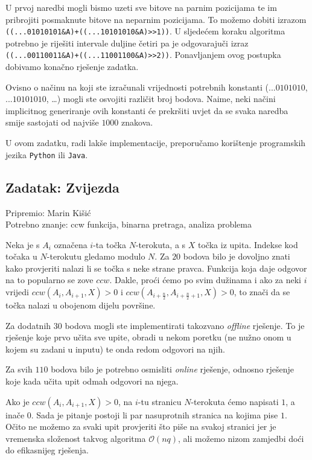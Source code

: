 \documentclass[a4paper]{article}
\begin{document}
U prvoj naredbi mogli bismo uzeti sve bitove na parnim pozicijama te im
pribrojiti posmaknute bitove na neparnim pozicijama. To možemo dobiti izrazom
\verb|((...01010101&A)+((...10101010&A)>>1))|. U sljedećem koraku algoritma
potrebno je riješiti intervale duljine četiri pa je odgovarajuči izraz
\verb|((...00110011&A)+((...11001100&A)>>2))|. Ponavljanjem ovog postupka
dobivamo konačno rješenje zadatka.

Ovisno o načinu na koji ste izračunali vrijednosti potrebnih konstanti
($...0101010$, $...10101010$, \dots) mogli ste osvojiti različit broj
bodova. Naime, neki načini implicitnog generiranje ovih konstanti
će prekršiti uvjet da se svaka naredba smije sastojati od najviše $1000$
znakova.

U ovom zadatku, radi lakše implementacije, preporučamo korištenje programskih
jezika \texttt{Python} ili \texttt{Java}.

\subsection*{Zadatak: Zvijezda}
\textsf{Pripremio: Marin Kišić}\\
\textsf{Potrebno znanje: ccw funkcija, binarna pretraga, analiza problema}

Neka je s $A_i$ označena $i$-ta točka $N$-terokuta, a s $X$ točka iz upita.
Indekse kod točaka u $N$-terokutu gledamo modulo $N$.  Za $20$ bodova bilo je
dovoljno znati kako provjeriti nalazi li se točka s neke strane pravca.
Funkcija koja daje odgovor na to popularno se zove $ccw$. Dakle, proći ćemo po
svim dužinama i ako za neki $i$ vrijedi $ccw(A_i, A_{i+1}, X) > 0$ i
$ccw(A_{i+\frac{n}{2}}, A_{i+\frac{n}{2}+1}, X) > 0$, to znači da se točka
nalazi u obojenom dijelu površine.

Za dodatnih $30$ bodova mogli ste implementirati takozvano \textit{offline}
rješenje.  To je rješenje koje prvo učita sve upite, obradi u nekom poretku (ne
nužno onom u kojem su zadani u inputu) te onda redom odgovori na njih.

Za svih $110$ bodova bilo je potrebno osmisliti \textit{online} rješenje,
odnosno rješenje koje kada učita upit odmah odgovori na njega.

Ako je $ccw(A_{i}, A_{i+1}, X) > 0$, na $i$-tu stranicu $N$-terokuta ćemo
napisati $1$, a inače $0$. Sada je pitanje postoji li par nasuprotnih stranica
na kojima pise $1$.  Očito ne možemo za svaki upit provjeriti što piše na
svakoj stranici jer je vremenska složenost takvog algoritma $\mathcal{O}(nq)$,
ali možemo nizom zamjedbi doći do efikasnijeg rješenja.
\end{document}
